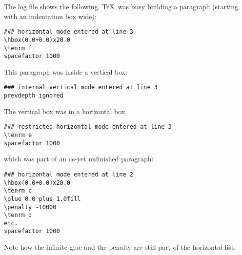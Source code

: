 \documentclass[twoside,letterpaper,openright]{rapport3}
\begin{document}
The log file shows the following. \TeX\ was busy
building a paragraph (starting with an indentation box
\n{20pt} wide):\begin{verbatim}
### horizontal mode entered at line 3
\hbox(0.0+0.0)x20.0
\tenrm f
spacefactor 1000
\end{verbatim}
This paragraph was inside a vertical box:\begin{verbatim}
### internal vertical mode entered at line 3
prevdepth ignored
\end{verbatim}
The vertical box was in  a horizontal box, 
\begin{verbatim}
### restricted horizontal mode entered at line 3
\tenrm e
spacefactor 1000
\end{verbatim}
which was part of
an as-yet unfinished paragraph:\begin{verbatim}
### horizontal mode entered at line 2
\hbox(0.0+0.0)x20.0
\tenrm c
\glue 0.0 plus 1.0fill
\penalty -10000
\tenrm d
etc.
spacefactor 1000
\end{verbatim}
Note how the infinite glue and the  penalty
are still part of the horizontal list.
\end{document}
